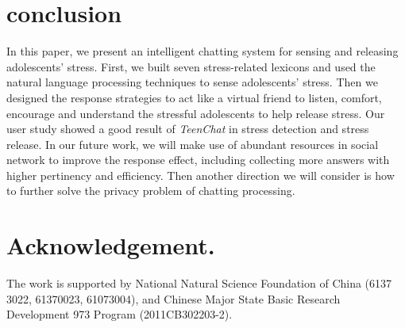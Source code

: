 \section{conclusion}
In this paper, we present an intelligent chatting system for sensing and releasing adolescents' stress. First, we built seven stress-related lexicons and used the natural language processing techniques to sense adolescents' stress. Then we designed the response strategies to act like a virtual friend to listen, comfort, encourage and understand the stressful adolescents to help release stress. Our user study showed a good result of \emph{TeenChat} in stress detection and stress release. In our future work, we will make use of abundant resources in social network to improve the response effect, including collecting more answers with higher pertinency and efficiency. Then another direction we will consider is how to further solve the privacy problem of chatting processing.\\
\section*{Acknowledgement. }
The work is supported by National Natural Science Foundation of China (6137
3022, 61370023, 61073004), and Chinese Major State Basic Research Development 973 Program (2011CB302203-2).

